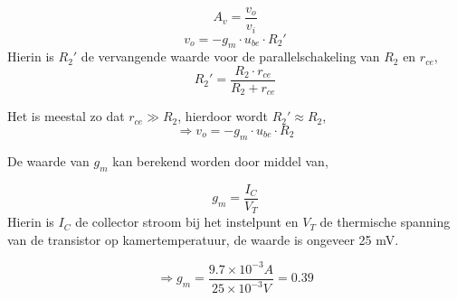 \documentclass[11pt]{article}
\begin{document}
\begin{equation}
A_v=\frac{v_o}{v_i}
\end{equation}
$$v_o=-g_m\cdot u_{be}\cdot R_2'$$
Hierin is $R_2'$ de vervangende waarde voor de parallelschakeling van $R_2$ en $r_{ce}$,
$$R_2'=\frac{R_2\cdot r_{ce}}{R_2+r_{ce}}$$

\noindent Het is meestal zo dat $r_{ce}\gg R_2$, hierdoor wordt $R_2'\approx R_2$,
$$\Rightarrow v_o=-g_m\cdot u_{be}\cdot R_2$$

\noindent De waarde van $g_m$ kan berekend worden door middel van,

\begin{equation}
g_m=\frac{I_C}{V_T}
\end{equation}
Hierin is $I_C$ de collector stroom bij het instelpunt en $V_T$ de thermische spanning van de transistor op kamertemperatuur, de waarde is ongeveer 25 mV.

$$\Rightarrow g_m=\frac{9.7\times 10^{-3}A}{25\times 10^{-3}V}= 0.39$$
\end{document}

